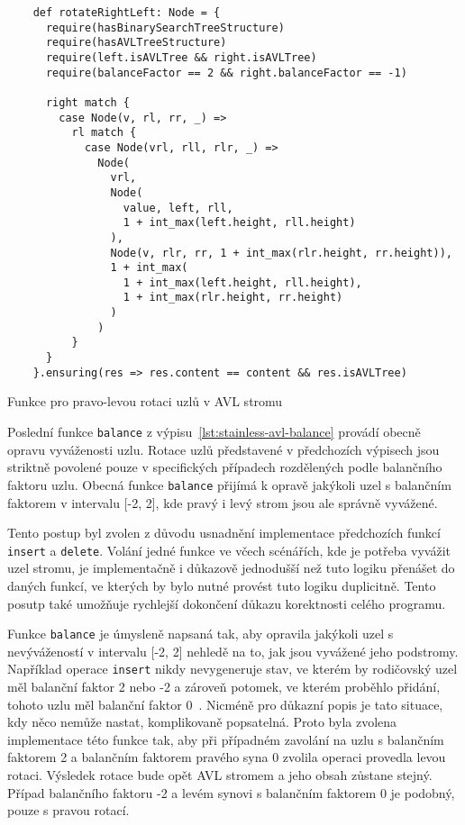 \begin{listing}[H]
  \begin{verbatim}
    def rotateRightLeft: Node = {
      require(hasBinarySearchTreeStructure)
      require(hasAVLTreeStructure)
      require(left.isAVLTree && right.isAVLTree)
      require(balanceFactor == 2 && right.balanceFactor == -1)

      right match {
        case Node(v, rl, rr, _) =>
          rl match {
            case Node(vrl, rll, rlr, _) =>
              Node(
                vrl,
                Node(
                  value, left, rll,
                  1 + int_max(left.height, rll.height)
                ),
                Node(v, rlr, rr, 1 + int_max(rlr.height, rr.height)),
                1 + int_max(
                  1 + int_max(left.height, rll.height),
                  1 + int_max(rlr.height, rr.height)
                )
              )
          }
      }
    }.ensuring(res => res.content == content && res.isAVLTree)
  \end{verbatim}
  \caption{Funkce pro pravo-levou rotaci uzlů v AVL stromu}
  \label{lst:stainless-avl-rotateRightLeft}
\end{listing}

Poslední funkce \texttt{balance} z výpisu~\ref{lst:stainless-avl-balance}
provádí obecně opravu vyváženosti uzlu.
Rotace uzlů představené v předchozích výpisech
jsou striktně povolené pouze v specifických případech rozdělených podle
balančního faktoru uzlu.
Obecná funkce \texttt{balance} přijímá k opravě jakýkoli uzel s balančním faktorem
v intervalu [-2, 2], kde pravý i levý strom jsou ale správně vyvážené.

Tento postup byl zvolen z důvodu usnadnění implementace předchozích funkcí \texttt{insert} a \texttt{delete}.
Volání jedné funkce ve včech scénářích, kde je potřeba vyvážit uzel stromu,
je implementačně i důkazově jednodušší než tuto logiku přenášet do daných funkcí,
ve kterých by bylo nutné provést tuto logiku duplicitně.
Tento posutp také umožňuje rychlejší dokončení důkazu korektnosti celého programu.

Funkce \texttt{balance} je úmysleně napsaná tak, aby opravila
jakýkoli uzel s nevývážeností v intervalu [-2, 2] nehledě na to,
jak jsou vyvážené jeho podstromy.
Například operace \texttt{insert} nikdy nevygeneruje stav,
ve kterém by rodičovský uzel měl balanční faktor 2 nebo -2
a zároveň potomek, ve kterém proběhlo přidání, tohoto uzlu měl balanční faktor 0~\cite{Pruvodce22}.
Nicméně pro důkazní popis je tato situace, kdy něco nemůže nastat,
komplikovaně popsatelná.
Proto byla zvolena implementace této funkce tak,
aby při případném zavolání na uzlu s balančním faktorem 2 a balančním faktorem pravého syna 0
zvolila operaci provedla levou rotaci.
Výsledek rotace bude opět AVL stromem a jeho obsah zůstane stejný.
Případ balančního faktoru -2 a levém synovi s balančním faktorem 0 je podobný,
pouze s pravou rotací.


